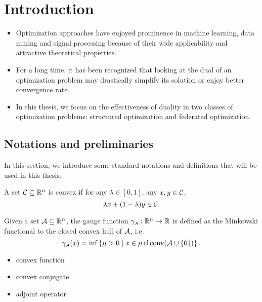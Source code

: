 \chapter{Introduction}
\label{ch:Introduction}

\begin{itemize}
    \item Optimization approaches have enjoyed prominence in machine learning, data mining and signal processing because of their wide applicability and attractive theoretical properties.
    \item For a long time, it has been recognized that looking at the dual of an optimization problem may drastically simplify its solution or enjoy better convergence rate.
    \item In this thesis, we focus on the effectiveness of duality in two classes of optimization problems: structured optimization and federated optimization. 
\end{itemize}

  

\section{Notations and preliminaries}

In this section, we introduce some standard notations and definitions that will be used in this thesis. 

\begin{definition} \label{def:cvx_set}
    A set $\mathcal{C} \subseteq \mathbb{R}^n$ is convex if for any $\lambda \in [0,1]$, any $x, y \in \mathcal{C}$, 
    \[\lambda x + (1-\lambda) y \in \mathcal{C}.\]
\end{definition}

\begin{definition} \label{def:gauge}
    Given a set $\mathcal{A} \subseteq \mathbb{R}^n$, the gauge function $\gamma_{\scriptscriptstyle\mathcal{A}}:\mathbb{R}^n\to\mathbb{R}$ is defined as the Minkowski functional to the closed convex hull of $\mathcal{A}$, i.e. 
    \[\gamma_{\scriptscriptstyle\mathcal{A}}(x) = \inf\left\{\mu > 0 \mid x \in \mu\operatorname{cl}\operatorname{conv}(\mathcal{A}\cup\{0\})\right\}.\]
\end{definition}

\begin{itemize}
    \item convex function
    \item convex conjugate 
    \item adjoint operator
\end{itemize}

